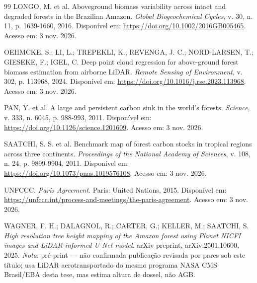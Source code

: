 \begin{thebibliography}{99}
 LONGO, M. et al. Aboveground biomass variability across
intact and degraded forests in the Brazilian Amazon. \textit{Global
Biogeochemical Cycles}, v. 30, n. 11, p. 1639-1660, 2016. Disponível em:
\url{https://doi.org/10.1002/2016GB005465}. Acesso em: 3 nov. 2026.

 OEHMCKE, S.; LI, L.; TREPEKLI, K.; REVENGA, J. C.;
NORD-LARSEN, T.; GIESEKE, F.; IGEL, C. Deep point cloud regression for
above-ground forest biomass estimation from airborne LiDAR. \textit{Remote
Sensing of Environment}, v. 302, p. 113968, 2024. Disponível em:
\url{https://doi.org/10.1016/j.rse.2023.113968}. Acesso em: 3 nov. 2026.

 PAN, Y. et al. A large and persistent carbon sink in the
world's forests. \textit{Science}, v. 333, n. 6045, p. 988-993, 2011.
Disponível em: \url{https://doi.org/10.1126/science.1201609}. Acesso em:
3 nov. 2026.

 SAATCHI, S. S. et al. Benchmark map of forest carbon
stocks in tropical regions across three continents. \textit{Proceedings of
the National Academy of Sciences}, v. 108, n. 24, p. 9899-9904, 2011.
Disponível em: \url{https://doi.org/10.1073/pnas.1019576108}. Acesso em:
3 nov. 2026.

 UNFCCC. \textit{Paris Agreement}. Paris: United Nations,
2015. Disponível em:
\url{https://unfccc.int/process-and-meetings/the-paris-agreement}. Acesso em:
3 nov. 2026.

 WAGNER, F. H.; DALAGNOL, R.; CARTER, G.; KELLER, M.;
SAATCHI, S. \textit{High resolution tree height mapping of the Amazon forest
using Planet NICFI images and LiDAR-informed U-Net model}. arXiv preprint,
arXiv:2501.10600, 2025. \textit{Nota}: pré-print --- não confirmada publicação
revisada por pares sob este título; usa LiDAR aerotransportado do mesmo
programa NASA CMS Brasil/EBA desta tese, mas estima altura de dossel, não AGB.

\end{thebibliography}
